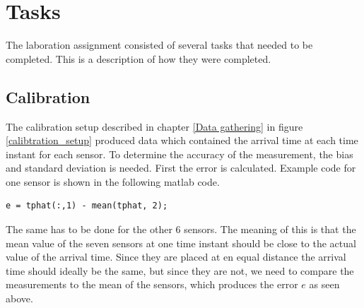 \documentclass[10pt,a4paper]{report}
\begin{document}
\newpage
\chapter{Tasks}
\label{Tasks}
The laboration assignment consisted of several tasks that needed to be completed. This is a description of how they were completed.

\section{Calibration}
\label{Calibration}
The calibration setup described in chapter \ref{Data gathering} in figure \ref{calibtration_setup} produced data which contained the arrival time at each time instant for each sensor. To determine the accuracy of the measurement, the bias and standard deviation is needed. First the error is calculated. Example code for one sensor is shown in the following matlab code. 
\begin{verbatim}
e = tphat(:,1) - mean(tphat, 2);
\end{verbatim}
The same has to be done for the other 6 sensors. The meaning of this is that the mean value of the seven sensors at one time instant should be close to the actual value of the arrival time. Since they are placed at en equal distance the arrival time should ideally be the same, but since they are not, we need to compare the measurements to the mean of the sensors, which produces the error $e$ as seen above.
\end{document}
